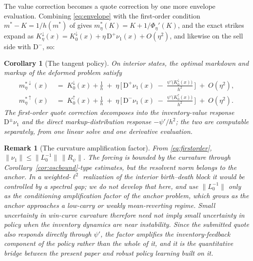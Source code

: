 \documentclass[11pt]{article}
\newtheorem{corollary}{Corollary}
\newtheorem{remark}{Remark}
\begin{document}
The value correction becomes a quote correction by one more envelope evaluation. Combining \eqref{eq:envelope} with the first-order condition $m^\ast - K = 1/h(m^\ast)$ of \citet{cotton2026skew} gives $m^\ast_\eta(K) = K + 1/\Phi_\eta'(K)$, and the exact strikes expand as $K^{\downarrow}_\eta(x) = K^{\downarrow}_0(x) + \eta\,\mathrm{D}^{+}\nu_1(x) + O(\eta^2)$, and likewise on the sell side with $\mathrm{D}^{-}$, so:

\begin{corollary}[The tangent policy]\label{cor:tangentpolicy}
On interior states, the optimal markdown and markup of the deformed problem satisfy
\begin{align*}
m^{\ast\downarrow}_\eta(x) \;&=\; K^{\downarrow}_0(x) + \frac1h
\;+\; \eta\,\Big[\, \mathrm{D}^{+}\nu_1(x) \;-\; \frac{\psi'\big(K^{\downarrow}_0(x)\big)}{h^{2}} \,\Big] \;+\; O(\eta^2), \\
m^{\ast\uparrow}_\eta(x) \;&=\; K^{\uparrow}_0(x) + \frac1h
\;+\; \eta\,\Big[\, \mathrm{D}^{-}\nu_1(x) \;-\; \frac{\psi'\big(K^{\uparrow}_0(x)\big)}{h^{2}} \,\Big] \;+\; O(\eta^2).
\end{align*}
The first-order quote correction decomposes into the inventory-value response $\mathrm{D}^{\pm}\nu_1$ and the direct markup-distribution response $-\psi'/h^2$; the two are computable separately, from one linear solve and one derivative evaluation.
\end{corollary}

\begin{remark}[The curvature amplification factor]\label{rem:resolvent}
From \eqref{eq:firstorder}, $\|\nu_1\| \le \|L_0^{-1}\|\,\|R_\psi\|$. The forcing is bounded by the curvature through Corollary~\ref{cor:oscbound}-type estimates, but the resolvent norm belongs to the anchor. In a weighted-$\ell^2$ realization of the interior birth--death block it would be controlled by a spectral gap; we do not develop that here, and use $\|L_0^{-1}\|$ only as the conditioning amplification factor of the anchor problem, which grows as the anchor approaches a low-carry or weakly mean-reverting regime. Small uncertainty in win-curve curvature therefore need not imply small uncertainty in policy when the inventory dynamics are near instability. Since the submitted quote also responds directly through $\psi'$, the factor amplifies the \emph{inventory-feedback} component of the policy rather than the whole of it, and it is the quantitative bridge between the present paper and robust policy learning built on it.
\end{remark}
\end{document}
